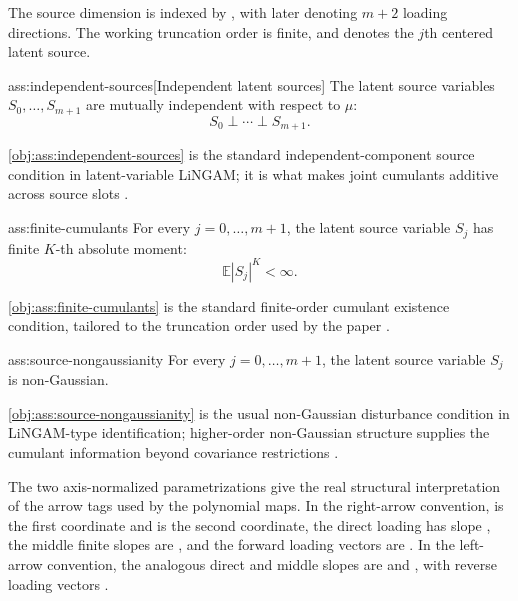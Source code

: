 The source dimension is indexed by , with  later denoting \(m+2\) loading directions. The working truncation order  is finite, and  denotes the \(j\)th centered latent source.

\begin{assumptionv}{ass:independent-sources}[Independent latent sources]
The latent source variables \(S_0,\ldots,S_{m+1}\) are mutually independent with respect to \(\mu\):
\[
S_0\perp\cdots\perp S_{m+1}.
\]
\end{assumptionv}

\cref{obj:ass:independent-sources} is the standard independent-component source condition in latent-variable LiNGAM; it is what makes joint cumulants additive across source slots \citep{ChenPengHuangEtAl2025Direction}.

\begin{assumptionv}{ass:finite-cumulants}
For every \(j=0,\ldots,m+1\), the latent source variable \(S_j\) has finite \(K\)-th absolute moment:
\[
\mathbb E |S_j|^K<\infty .
\]
\end{assumptionv}

\cref{obj:ass:finite-cumulants} is the standard finite-order cumulant existence condition, tailored to the truncation order used by the paper \citep{ChenPengHuangEtAl2025Direction}.

\begin{assumptionv}{ass:source-nongaussianity}
For every \(j=0,\ldots,m+1\), the latent source variable \(S_j\) is non-Gaussian.
\end{assumptionv}

\cref{obj:ass:source-nongaussianity} is the usual non-Gaussian disturbance condition in LiNGAM-type identification; higher-order non-Gaussian structure supplies the cumulant information beyond covariance restrictions \citep{ChenPengHuangEtAl2025Direction}.

The two axis-normalized parametrizations give the real structural interpretation of the arrow tags used by the polynomial maps. In the right-arrow convention,  is the first coordinate and  is the second coordinate, the direct loading has slope , the middle finite slopes are , and the forward loading vectors are . In the left-arrow convention, the analogous direct and middle slopes are  and , with reverse loading vectors .

